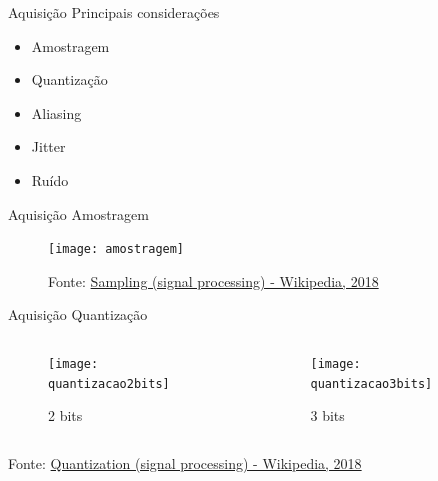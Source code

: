 \documentclass[t]{beamer}
\begin{document}
\begin{frame}{Aquisição}
	Principais considerações
	\begin{itemize}
		\item Amostragem 
		\item Quantização
		\item Aliasing
		\item Jitter
		\item Ruído
	\end{itemize}
\end{frame}

\begin{frame}{Aquisição}
	Amostragem
	\begin{figure}
		\texttt{[image: amostragem]}
		
		{\scriptsize Fonte: \href{https://en.wikipedia.org/wiki/Sampling_(signal_processing)}{Sampling (signal processing) - Wikipedia, 2018}}
	\end{figure}	
\end{frame}

\begin{frame}{Aquisição}
	Quantização
	\begin{columns}
		\begin{column}{0.5\textwidth}
			\begin{figure}
				\texttt{[image: quantizacao2bits]}
				\caption{2 bits}
			\end{figure}
		\end{column}
		\begin{column}{0.5\textwidth}
			\begin{figure}
				\texttt{[image: quantizacao3bits]}
				\caption{3 bits}
			\end{figure}
		\end{column}
	\end{columns}
	{\scriptsize Fonte: \href{https://en.wikipedia.org/wiki/Quantization_(signal_processing)}{Quantization (signal processing) - Wikipedia, 2018}}
\end{frame}
\end{document}
